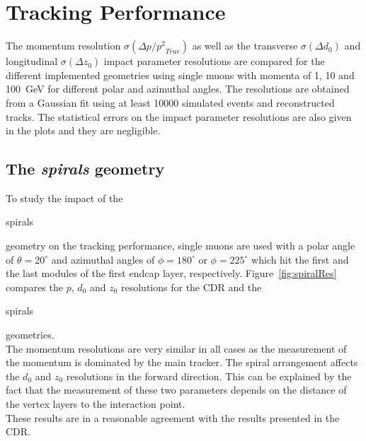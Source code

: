 \section{Tracking Performance}\label{sec:trackingPerformance}

The momentum resolution $\sigma(\Delta p/{p^{2}}_{True})$ as well as the
transverse $\sigma(\Delta d_{0})$ and longitudinal $\sigma(\Delta z_{0})$ impact parameter resolutions are compared for the different implemented geometries using single muons with momenta of 1, 10 and 100~GeV for different polar and azimuthal angles. The resolutions are obtained from a Gaussian fit using at least 10000 simulated events and reconstructed tracks.
The statistical errors on the impact parameter resolutions are also given in the plots and they are negligible.

\subsection{The \emph{spirals} geometry}

To study the impact of the \begin{it}spirals\end{it} geometry on the tracking performance, single muons are used with a polar angle of $\theta=20^{\circ}$ and azimuthal angles of $\phi=180^{\circ}$ or $\phi=225^{\circ}$ which hit the first and the last modules of the first endcap layer, respectively. Figure~\ref{fig:spiralRes} compares the $p$, $d_{0}$ and $z_{0}$ resolutions for the CDR and the \begin{it}spirals\end{it} geometries. \\
The momentum resolutions are very similar in all cases as the measurement of the momentum is dominated by the main tracker. The spiral arrangement affects the $d_0$ and $z_0$ resolutions in the forward direction. This can be explained by the fact that the measurement of these two parameters depends on the distance of the vertex layers to the interaction point. \\
These results are in a reasonable agreement with the results presented in the CDR.

